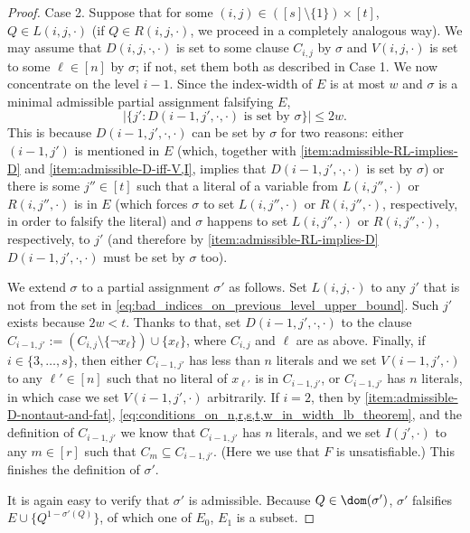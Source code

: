 \begin{proof}
Case 2. Suppose that for some $(i,j) \in ([s] \setminus \{1\}) \times [t]$, $Q \in L(i,j, \cdot)$ (if $Q \in R(i,j, \cdot)$, we proceed in a completely analogous way). We may assume that $D(i,j,\cdot, \cdot)$ is set to some clause $C_{i,j}$ by $\sigma$ and $V(i,j,\cdot)$ is set to some $\ell \in [n]$ by $\sigma$; if not, set them both as described in Case 1. We now concentrate on the level $i-1$. Since the index-width of $E$ is at most $w$ and $\sigma$ is a minimal admissible partial assignment falsifying $E$, 
\begin{equation}
\label{eq:bad_indices_on_previous_level_upper_bound}
 \left| \{j': D(i-1,j', \cdot, \cdot) \text{ is set by }  \sigma  \} \right| \leq 2w.
\end{equation}
This is because $D(i-1,j', \cdot, \cdot)$ can be set by $\sigma$ for two reasons: either $(i-1,j')$ is mentioned in $E$ (which, together with \ref{item:admissible-RL-implies-D} and \ref{item:admissible-D-iff-V,I}, implies that $D(i-1,j', \cdot, \cdot)$ is set by $\sigma$) or there is some $j'' \in [t]$ such that a literal of a variable from $L(i,j'', \cdot)$ or $R(i,j'', \cdot)$ is in $E$ (which forces $\sigma$ to set $L(i,j'', \cdot)$ or $R(i,j'', \cdot)$, respectively, in order to falsify the literal) and $\sigma$ happens to set $L(i,j'', \cdot)$ or $R(i,j'', \cdot)$, respectively, to $j'$ (and therefore by \ref{item:admissible-RL-implies-D} $D(i-1,j', \cdot, \cdot)$ must be set by $\sigma$ too).

We extend $\sigma$ to a partial assignment $\sigma'$ as follows. Set $L(i,j, \cdot)$ to any $j'$ that is not from the set in \eqref{eq:bad_indices_on_previous_level_upper_bound}. Such $j'$ exists because $2w < t$. Thanks to that, set $D(i-1,j',\cdot, \cdot)$ to the clause $C_{i-1,j'} := (C_{i,j} \setminus \{\neg x_{\ell}\} ) \cup \{x_{\ell}\}$, where $C_{i,j}$ and $\ell$ are as above. Finally, if $i \in \{3,\ldots, s\}$, then either $C_{i-1,j'}$ has less than $n$ literals and we set $V(i-1,j',\cdot)$ to any $\ell' \in [n]$ such that no literal of $x_{\ell'}$ is in $C_{i-1,j'}$, or $C_{i-1,j'}$ has $n$ literals, in which case we set $V(i-1,j',\cdot)$ arbitrarily. If $i=2$, then by \ref{item:admissible-D-nontaut-and-fat}, \eqref{eq:conditions_on_n,r,s,t,w_in_width_lb_theorem}, and the definition of $C_{i-1,j'}$ we know that $C_{i-1,j'}$ has $n$ literals, and we set $I(j',\cdot)$ to any $m \in [r]$ such that $C_m \subseteq C_{i-1,j'}$. (Here we use that $F$ is unsatisfiable.) This finishes the definition of $\sigma'$. 

It is again easy to verify that $\sigma'$ is admissible. Because $Q \in \dom(\sigma')$, $\sigma'$ falsifies $E \cup \{Q^{1-\sigma'(Q)}\}$, of which one of $E_0$, $E_1$ is a subset. 
\end{proof}	

